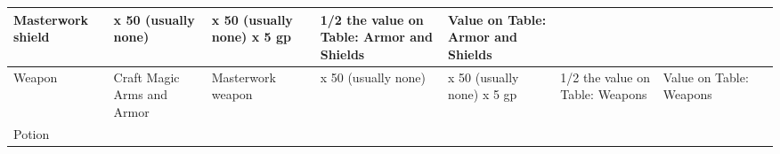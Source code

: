 \begin{longtable}{llllllllllllll}
{\begin{minipage}[t]{0.039in}
Masterwork shield \end{minipage}} & \multicolumn{1}{p{0.039in}|}{\begin{minipage}[t]{0.039in}\raggedright
x 50 (usually none)\end{minipage}} & \multicolumn{1}{p{0.039in}|}{\begin{minipage}[t]{0.039in}\raggedright
x$ $ 50 (usually none) \linebreak
x 5 gp\end{minipage}} & \multicolumn{1}{p{0.039in}|}{\begin{minipage}[t]{0.039in}\raggedright
1/2 the value on Table: Armor and Shields\end{minipage}} & \multicolumn{1}{p{0.039in}|}{\begin{minipage}[t]{0.039in}\raggedright
Value on Table: Armor and Shields\end{minipage}}\\
\hline
\multicolumn{1}{|p{0.472in}|}{\begin{minipage}[t]{0.472in}\centering
Weapon \end{minipage}} & \multicolumn{1}{p{0.639in}|}{\begin{minipage}[t]{0.639in}\raggedright
Craft Magic Arms and Armor\end{minipage}} & \multicolumn{1}{p{0.497in}|}{\begin{minipage}[t]{0.497in}\raggedright
Masterwork weapon \end{minipage}} & \multicolumn{1}{p{0.564in}|}{\begin{minipage}[t]{0.564in}\raggedright
x 50 (usually none) \end{minipage}} & \multicolumn{1}{p{0.544in}|}{\begin{minipage}[t]{0.544in}\raggedright
x 50 (usually none) \linebreak
x 5 gp\end{minipage}} & \multicolumn{1}{p{0.739in}|}{\begin{minipage}[t]{0.739in}\raggedright
1/2 the value on Table: Weapons \end{minipage}} & \multicolumn{8}{p{1.044in}|}{\begin{minipage}[t]{1.044in}\raggedright
Value on Table: Weapons\end{minipage}}\\
\hline
\multicolumn{1}{p{0.039in}|}{\begin{minipage}[t]{0.039in}\centering
Potion \end{minipage}} & \multicolumn{1}{p{0.039in}|}{\begin{minipage}[t]{0.039in}\raggedright

\end{minipage}}
\end{longtable}
